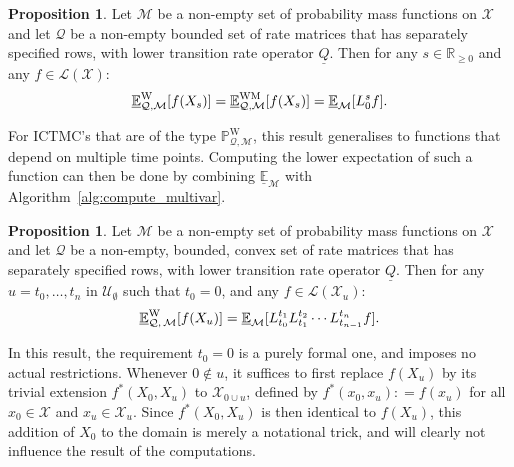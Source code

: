 \documentclass[10pt,a4paper]{paper}
\theoremstyle{definition}
\newtheorem{proposition}[theorem]{Proposition}
\newcommand{\reals}{\mathbb{R}}
\newcommand{\realsnonneg}{\reals_{\geq 0}}
\newcommand{\states}{\mathcal{X}}
\newcommand{\processes}{\mathbb{P}}
\newcommand{\wprocesses}{\processes^{\mathrm{W}}}
\newcommand{\gambles}{\mathcal{L}}
\newcommand{\gamblesX}{\gambles(\states)}
\newcommand{\rateset}{\mathcal{Q}}
\newcommand{\lrate}{\underline{Q}}
\newcommand{\coloneqq}{:\!=}
\newcommand{\ictmc}{{ICTMC}}
\begin{document}
\begin{proposition}\label{prop:computemarginal}
Let $\mathcal{M}$ be a non-empty set of probability mass functions on $\states$ and let $\rateset$ be a non-empty bounded set of rate matrices that has separately specified rows, with lower transition rate operator $\lrate$. Then for any $s\in\realsnonneg$ and any $f\in\gamblesX$:
\begin{equation*}
\underline{\mathbb{E}}^\mathrm{W}_{\rateset,\mathcal{M}}[f(X_s)]
=
\underline{\mathbb{E}}^\mathrm{WM}_{\rateset,\mathcal{M}}[f(X_s)]
=
\underline{\mathbb{E}}_{\mathcal{M}}[L_0^s f].\vspace{5pt}
\end{equation*}
\end{proposition}

For {\ictmc}'s that are of the type $\wprocesses_{\rateset,\mathcal{M}}$, this result generalises to functions that depend on multiple time points. Computing the lower expectation of such a function can then be done by combining $\underline{\mathbb{E}}_{\mathcal{M}}$ with Algorithm~\ref{alg:compute_multivar}.

\begin{proposition}\label{prop:computeunconditional}
Let $\mathcal{M}$ be a non-empty set of probability mass functions on $\states$ and let $\rateset$ be a non-empty, bounded, convex set of rate matrices that has separately specified rows, with lower transition rate operator $\lrate$. Then for any $u=t_0,\dots,t_n$ in $\mathcal{U}_{\emptyset}$ such that $t_0=0$, and any $f\in\gambles(\states_u)$:
\begin{equation*}
\underline{\mathbb{E}}_{\rateset,\,\mathcal{M}}^\mathrm{W}[f(X_u)]
=
\underline{\mathbb{E}}_{\mathcal{M}}[L_{t_0}^{t_1}L_{t_1}^{t_2}\cdots L_{t_{n-1}}^{t_n}f].\vspace{5pt}
\end{equation*}
\end{proposition}
\noindent
In this result, the requirement $t_0=0$ is a purely formal one, and imposes no actual restrictions. Whenever $0\notin u$, it suffices to first replace $f(X_u)$ by its trivial extension $f^*(X_0,X_u)$ to $\states_{0\cup u}$, defined by $f^*(x_0,x_u)\coloneqq f(x_u)$ for all $x_0\in\states$ and $x_u\in\states_u$. Since $f^*(X_0,X_u)$ is then identical to $f(X_u)$, this addition of $X_0$ to the domain is merely a notational trick, and will clearly not influence the result of the computations. 



\end{document}
